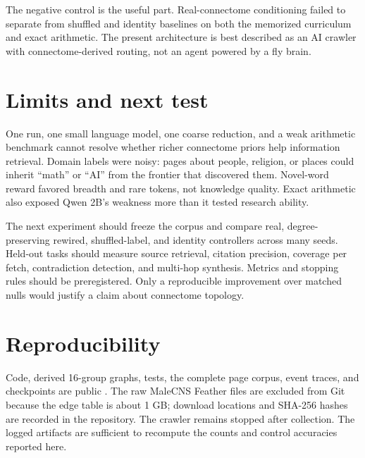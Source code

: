 \documentclass[9pt,twocolumn]{extarticle}
\begin{document}
The negative control is the useful part. Real-connectome conditioning failed to separate from shuffled and identity baselines on both the memorized curriculum and exact arithmetic. The present architecture is best described as an AI crawler with connectome-derived routing, not an agent powered by a fly brain.

\section{Limits and next test}
One run, one small language model, one coarse reduction, and a weak arithmetic benchmark cannot resolve whether richer connectome priors help information retrieval. Domain labels were noisy: pages about people, religion, or places could inherit ``math'' or ``AI'' from the frontier that discovered them. Novel-word reward favored breadth and rare tokens, not knowledge quality. Exact arithmetic also exposed Qwen 2B's weakness more than it tested research ability.

The next experiment should freeze the corpus and compare real, degree-preserving rewired, shuffled-label, and identity controllers across many seeds. Held-out tasks should measure source retrieval, citation precision, coverage per fetch, contradiction detection, and multi-hop synthesis. Metrics and stopping rules should be preregistered. Only a reproducible improvement over matched nulls would justify a claim about connectome topology.

\section{Reproducibility}
Code, derived 16-group graphs, tests, the complete page corpus, event traces, and checkpoints are public \cite{repo}. The raw MaleCNS Feather files are excluded from Git because the edge table is about 1 GB; download locations and SHA-256 hashes are recorded in the repository. The crawler remains stopped after collection. The logged artifacts are sufficient to recompute the counts and control accuracies reported here.
\end{document}
